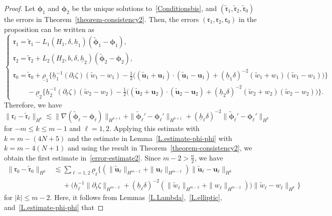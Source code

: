 \documentclass[11pt,leqno]{article}
\numberwithin{equation}{section}
\numberwithin{figure}{section}
\begin{document}
\begin{proof}
Let $\bm{\phi}_1$ and $\bm{\phi}_2$ be the unique solutions to~\eqref{Conditionsbis}, and 
$(\tilde{\bm{\mathfrak{r}}}_1,\tilde{\bm{\mathfrak{r}}}_2,\tilde{\mathfrak{r}}_0)$ the errors in 
Theorem~\ref{theorem-consistency2}. 
Then, the errors $(\bm{\mathfrak{r}}_1,\bm{\mathfrak{r}}_2,\mathfrak{r}_0)$ in the proposition can be written as 
%
\[
\begin{cases}
 \bm{\mathfrak{r}}_1 = \tilde{\bm{\mathfrak{r}}}_1 - L_1(H_1,\delta,\underline{h}_1)(\tilde{\bm{\phi}}_1-\bm{\phi}_1), \\
 \bm{\mathfrak{r}}_2 = \tilde{\bm{\mathfrak{r}}}_2 + L_2(H_2,b,\delta,\underline{h}_2)(\tilde{\bm{\phi}}_2-\bm{\phi}_2), \\
 \mathfrak{r}_0 = \tilde{\mathfrak{r}}_0 + \underline{\rho}_1\{
  \underline{h}_1^{-1}(\partial_t\zeta)(\tilde{w}_1-w_1)
   - \frac12\bigl( (\tilde{\bm{u}}_1+\bm{u}_1)\cdot(\tilde{\bm{u}}_1-\bm{u}_1)
    + (\underline{h}_1\delta)^{-2}(\tilde{w}_1+w_1)(\tilde{w}_1-w_1) \bigr)\} \\
 \qquad - \underline{\rho}_2\{
  \underline{h}_2^{-1}(\partial_t\zeta)(\tilde{w}_2-w_2)
   - \frac12\bigl( (\tilde{\bm{u}}_2+\bm{u}_2)\cdot(\tilde{\bm{u}}_2-\bm{u}_2)
    + (\underline{h}_2\delta)^{-2}(\tilde{w}_2+w_2)(\tilde{w}_2-w_2) \bigr)\}.
\end{cases}
\]
%
Therefore, we have 
%
\[
\|\bm{\mathfrak{r}}_\ell-\tilde{\bm{\mathfrak{r}}}_\ell\|_{H^k}
\lesssim \|\nabla(\tilde{\bm{\phi}}_\ell-\bm{\phi}_\ell)\|_{H^{k+1}} + \|\tilde{\bm{\phi}}_\ell'-\bm{\phi}_\ell'\|_{H^{k+1}}
 + (\underline{h}_\ell\delta)^{-2}\|\tilde{\bm{\phi}}_\ell'-\bm{\phi}_\ell'\|_{H^k}
\]
%
for $-m\leq k\leq m-1$ and $\ell=1,2$. 
Applying this estimate with $k=m-(4N+5)$ and the estimate in Lemma~\ref{L.estimate-phi-phi} with $k=m-4(N+1)$ 
and using the result in Theorem~\ref{theorem-consistency2}, we obtain the first estimate in~\eqref{error-estimate2}. 
Since $m-2>\frac{n}{2}$, we have 
%
\begin{align*}
\|\mathfrak{r}_0-\tilde{\mathfrak{r}}_0\|_{H^k}
&\lesssim \sum_{\ell=1,2}\underline{\rho}_\ell\{ 
 (\|\tilde{\bm{u}}_\ell\|_{H^{m-2}}+\|\bm{u}_\ell\|_{H^{m-2}}) \|\tilde{\bm{u}}_\ell-\bm{u}_\ell\|_{H^k} \\
&\quad\;
 + \bigl(\underline{h}_\ell^{-1}\|\partial_t\zeta\|_{H^{m-2}} + 
  (\underline{h}_\ell\delta)^{-2}(\|\tilde{w}_\ell\|_{H^{m-2}}+\|w_\ell\|_{H^{m-2}}) \bigr)\|\tilde{w}_\ell-w_\ell\|_{H^k} \}
\end{align*}
%
for $|k|\leq m-2$.
Here, it follows from Lemmas~\ref{L.Lambda},~\ref{L.elliptic}, and~\ref{L.estimate-phi-phi} that 

\end{proof}
\end{document}
